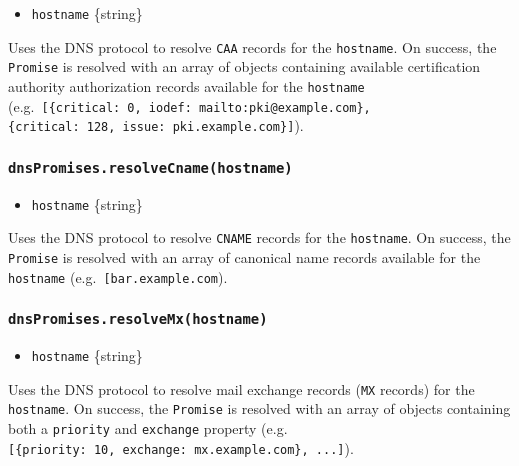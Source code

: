 \begin{itemize}
\tightlist
\item
  \texttt{hostname} \{string\}
\end{itemize}

Uses the DNS protocol to resolve \texttt{CAA} records for the
\texttt{hostname}. On success, the \texttt{Promise} is resolved with an
array of objects containing available certification authority
authorization records available for the \texttt{hostname}
(e.g.~\texttt{{[}\{critical:\ 0,\ iodef:\ \textquotesingle{}mailto:pki@example.com\textquotesingle{}\},\{critical:\ 128,\ issue:\ \textquotesingle{}pki.example.com\textquotesingle{}\}{]}}).

\subsubsection{\texorpdfstring{\texttt{dnsPromises.resolveCname(hostname)}}{dnsPromises.resolveCname(hostname)}}\label{dnspromises.resolvecnamehostname}

\begin{itemize}
\tightlist
\item
  \texttt{hostname} \{string\}
\end{itemize}

Uses the DNS protocol to resolve \texttt{CNAME} records for the
\texttt{hostname}. On success, the \texttt{Promise} is resolved with an
array of canonical name records available for the \texttt{hostname}
(e.g.~\texttt{{[}\textquotesingle{}bar.example.com\textquotesingle{}{]}}).

\subsubsection{\texorpdfstring{\texttt{dnsPromises.resolveMx(hostname)}}{dnsPromises.resolveMx(hostname)}}\label{dnspromises.resolvemxhostname}

\begin{itemize}
\tightlist
\item
  \texttt{hostname} \{string\}
\end{itemize}

Uses the DNS protocol to resolve mail exchange records (\texttt{MX}
records) for the \texttt{hostname}. On success, the \texttt{Promise} is
resolved with an array of objects containing both a \texttt{priority}
and \texttt{exchange} property (e.g.
\texttt{{[}\{priority:\ 10,\ exchange:\ \textquotesingle{}mx.example.com\textquotesingle{}\},\ ...{]}}).

